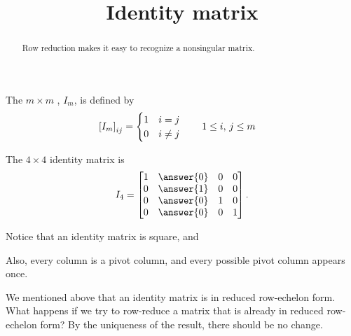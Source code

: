 \documentclass{ximera}
\title{Identity matrix}
\begin{document}
\begin{abstract}
  Row reduction makes it easy to recognize a nonsingular matrix.
\end{abstract}
\maketitle

\begin{definition}
The $m\times m$ , $I_m$, is defined by
\begin{align*}
  \left\lbrack I_m\right\rbrack_{ij}&=
                         \begin{cases}
                           1 & i=j\\
                           0 & i\neq j
                         \end{cases}
                               \quad\quad
                               1\leq i,\,j\leq m
\end{align*}
\end{definition}

\begin{example}
  The $4\times 4$ identity matrix is
  \[
    I_4=
    \begin{bmatrix}
      1&\answer{0}&0&0\\
      0&\answer{1}&0&0\\
      0&\answer{0}&1&0\\
      0&\answer{0}&0&1
    \end{bmatrix}.
  \]
\end{example}

\begin{question}
  Notice that an identity matrix is square, and
  \begin{multipleChoice}
  \end{multipleChoice}
  
  \begin{feedback}[correct]
    Also, every column is a pivot column, and every possible pivot column
    appears once.

    We mentioned above that an identity matrix is in reduced row-echelon
    form.  What happens if we try to row-reduce a matrix that is already
    in reduced row-echelon form?  By the uniqueness of the result, there
    should be no change.
  \end{feedback}
\end{question}
\end{document}
